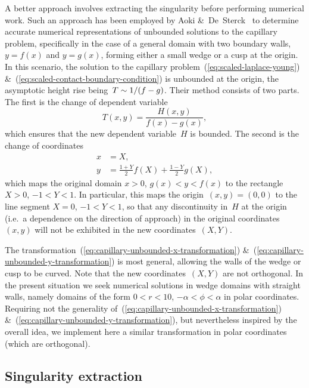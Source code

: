 A better approach involves extracting the singularity
before performing numerical work.
Such an approach has been employed by
Aoki \&~De~Sterck~\cite{aoki-2014-numerical-study-unbounded-capillary}
to determine accurate numerical representations
of unbounded solutions to the capillary problem,
specifically in the case of a general domain with two boundary walls,
$y = f (x)$ and $y = g (x)$,
forming either a small wedge or a cusp at the origin.
In this scenario,
the solution to the capillary problem~(\ref{eq:scaled-laplace-young})
\&~(\ref{eq:scaled-contact-boundary-condition})
is unbounded at the origin,
the asymptotic height rise being~$T \sim 1 / (f - g)$.
Their method consists of two parts.
The first is the change of dependent variable
\begin{equation}
  T (x, y) = \frac{H (x, y)}{f (x) - g(x)},
  \label{eq:capillary-unbounded-change-of-variable}
\end{equation}
which ensures that the new dependent variable~$H$ is bounded.
The second is the change of coordinates
\begin{align}
  x &= X,
    \label{eq:capillary-unbounded-x-transformation} \\
  y &= \frac{1 + Y}{2} f (X) + \frac{1 - Y}{2} g (X),
    \label{eq:capillary-unbounded-y-transformation}
\end{align}
which maps the original domain $x > 0$, $g (x) < y < f (x)$
to the rectangle $X > 0$, $-1 < Y < 1$.
In particular, this maps the origin~$(x, y) = (0, 0)$
to the line segment $X = 0$, $-1 < Y < 1$,
so that any discontinuity in~$H$ at the origin
(i.e.~a dependence on the direction of approach)
in the original coordinates~$(x, y)$
will not be exhibited in the new coordinates~$(X, Y)$.

The transformation~(\ref{eq:capillary-unbounded-x-transformation})
\&~(\ref{eq:capillary-unbounded-y-transformation})
is most general,
allowing the walls of the wedge or cusp to be curved.
Note that the new coordinates~$(X, Y)$ are not orthogonal.
In the present situation
we seek numerical solutions in wedge domains with straight walls,
namely domains of the form
$0 < r < 10$, $-\alpha < \phi < \alpha$
in polar coordinates.
Requiring not the generality of~(\ref{eq:capillary-unbounded-x-transformation})
\&~(\ref{eq:capillary-unbounded-y-transformation}),
but nevertheless inspired by the overall idea,
we implement here a similar transformation in polar coordinates
(which are orthogonal).

\subsection{Singularity extraction}
\label{sec:small.numerical.extraction}

